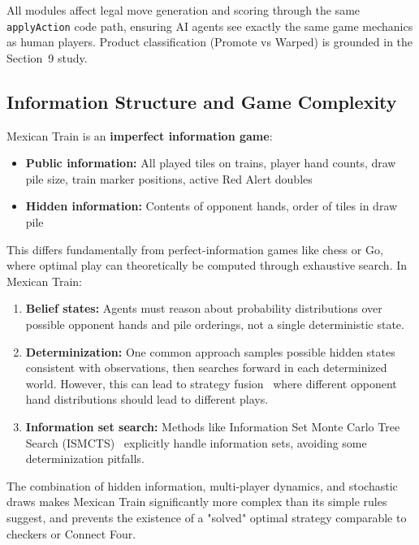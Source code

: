 \documentclass[11pt,letterpaper]{article}
\begin{document}
All modules affect legal move generation and scoring through the same \texttt{applyAction} code path, ensuring AI agents see exactly the same game mechanics as human players. Product classification (Promote vs Warped) is grounded in the Section~9 study.

\subsection{Information Structure and Game Complexity}

Mexican Train is an \textbf{imperfect information game}:

\begin{itemize}
\item \textbf{Public information:} All played tiles on trains, player hand counts, draw pile size, train marker positions, active Red Alert doubles
\item \textbf{Hidden information:} Contents of opponent hands, order of tiles in draw pile
\end{itemize}

This differs fundamentally from perfect-information games like chess or Go, where optimal play can theoretically be computed through exhaustive search. In Mexican Train:

\begin{enumerate}
\item \textbf{Belief states:} Agents must reason about probability distributions over possible opponent hands and pile orderings, not a single deterministic state.

\item \textbf{Determinization:} One common approach samples possible hidden states consistent with observations, then searches forward in each determinized world. However, this can lead to strategy fusion~\cite{frank1996determinization} where different opponent hand distributions should lead to different plays.

\item \textbf{Information set search:} Methods like Information Set Monte Carlo Tree Search (ISMCTS)~\cite{cowling2012ismcts} explicitly handle information sets, avoiding some determinization pitfalls.
\end{enumerate}

The combination of hidden information, multi-player dynamics, and stochastic draws makes Mexican Train significantly more complex than its simple rules suggest, and prevents the existence of a "solved" optimal strategy comparable to checkers or Connect Four.
\end{document}

